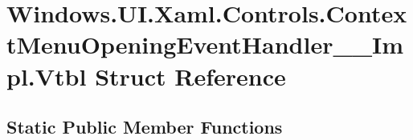 \hypertarget{struct_windows_1_1_u_i_1_1_xaml_1_1_controls_1_1_context_menu_opening_event_handler_____impl_1_1_vtbl}{}\section{Windows.\+U\+I.\+Xaml.\+Controls.\+Context\+Menu\+Opening\+Event\+Handler\+\_\+\+\_\+\+Impl.\+Vtbl Struct Reference}
\label{struct_windows_1_1_u_i_1_1_xaml_1_1_controls_1_1_context_menu_opening_event_handler_____impl_1_1_vtbl}
\subsection*{Static Public Member Functions}
